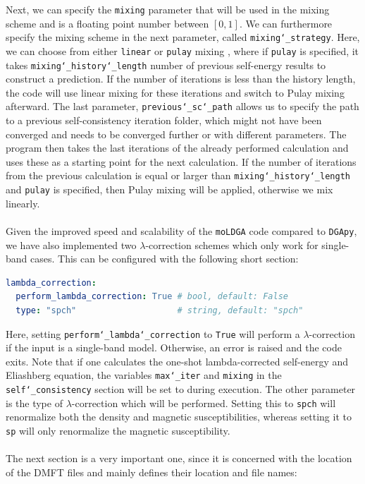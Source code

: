 \documentclass[../../main.tex]{subfiles}
\begin{document}
Next, we can specify the \texttt{mixing} parameter that will be used in the mixing scheme and is a floating point number between $[0,1]$. We can furthermore specify the mixing scheme in the next parameter, called \texttt{mixing\char`_strategy}. Here, we can choose from either \texttt{linear} or \texttt{pulay} mixing \cite{Banerjee2016}, where if \texttt{pulay} is specified, it takes \texttt{mixing\char`_history\char`_length} number of previous self-energy results to construct a prediction. If the number of iterations is less than the history length, the code will use linear mixing for these iterations and switch to Pulay mixing afterward. The last parameter, \texttt{previous\char`_sc\char`_path} allows us to specify the path to a previous self-consistency iteration folder, which might not have been converged and needs to be converged further or with different parameters. The program then takes the last iterations of the already performed calculation and uses these as a starting point for the next calculation. If the number of iterations from the previous calculation is equal or larger than \texttt{mixing\char`_history\char`_length} and \texttt{pulay} is specified, then Pulay mixing will be applied, otherwise we mix linearly.
\\\\
Given the improved speed and scalability of the \texttt{moLDGA} code compared to \texttt{DGApy}, we have also implemented two $\lambda$-correction schemes which only work for single-band cases. This can be configured with the following short section:

\begin{minipage}{\textwidth}%
\begin{lstlisting}[language=yaml]
lambda_correction:
  perform_lambda_correction: True # bool, default: False
  type: "spch"                    # string, default: "spch"
\end{lstlisting}
\end{minipage}
Here, setting \texttt{perform\char`_lambda\char`_correction} to \texttt{True} will perform a $\lambda$-correction if the input is a single-band model. Otherwise, an error is raised and the code exits. Note that if one calculates the one-shot lambda-corrected self-energy and Eliashberg equation, the variables \texttt{max\char`_iter} and \texttt{mixing} in the \texttt{self\char`_consistency} section will be set to  during execution. The other parameter is the type of $\lambda$-correction which will be performed. Setting this to \texttt{spch} will renormalize both the density and magnetic susceptibilities, whereas setting it to \texttt{sp} will only renormalize the magnetic susceptibility.
\\\\
The next section is a very important one, since it is concerned with the location of the DMFT files and mainly defines their location and file names:
\end{document}
